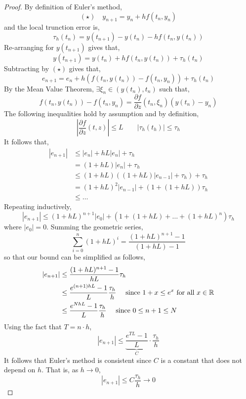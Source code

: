 \begin{proof}
	By definition of Euler's method,
	\[(\star) \quad y_{n+1}=y_n+h f\left(t_n, y_n\right)\]
	and the local trunction error is,
	\[\tau_h\left(t_n\right)=y\left(t_{n+1}\right)-y\left(t_n\right)-h f\left(t_n, y\left(t_n\right)\right)\]
	Re-arranging for $y(t_{n+1})$ gives that,
	\[y\left(t_{n+1}\right)=y\left(t_n\right)+h f\left(t_n, y\left(t_n\right)\right)+\tau_h\left(t_n\right)\]
	Subtracting by $(\star)$ gives that,
	\[e_{n+1}=e_n+h\left(f\left(t_n, y\left(t_n\right)\right)-f\left(t_n, y_n\right)\right)+\tau_h\left(t_n\right)\]
	By the Mean Value Theorem, $\exists \xi_n \in (y(t_n), t_n)$ such that,
	\[f\left(t_n, y\left(t_n\right)\right)-f\left(t_n, y_n\right) = \frac{\partial f}{\partial z}\left(t_n, \xi_n\right)\left(y\left(t_n\right)-y_n\right)\]
	The following inequalities hold by assumption and by definition,
	\[\left|\frac{\partial f}{\partial z}(t, z)\right| \leq L \quad \quad \left|\tau_h\left(t_h\right)\right| \leq \tau_h\]
	It follows that,
	\begin{align*}
	\left|e_{n+1}\right| & \leq\left|e_n\right|+h L\left|e_n\right|+\tau_h \\
	&=(1+h L)\left|e_n\right|+\tau_h \\
	& \leq(1+h L)\left((1+h L)\left|e_{n-1}\right|+\tau_h\right)+\tau_h \\
	&=(1+h L)^2\left|e_{n-1}\right|+(1+(1+h L)) \tau_h \\
	& \leq \ldots
	\end{align*}
	Repeating inductively,
	\[\left|e_{n+1}\right| \leq(1+h L)^{n+1}\left|e_0\right|+\left(1+(1+h L)+\ldots+(1+h L)^n\right) \tau_h\]
	where $|e_0| = 0$. Summing the geometric series,
	\[\sum_{i=0}^n(1+h L)^i = \frac{(1+h L)^{n+1}-1}{(1+h L)-1}\]
	so that our bound can be simplified as follows,
	\begin{align*}
	|e_{n+1}|
	&\leq \frac{(1+h L)^{n+1}-1}{h L} \tau_h \\
	&\leq \frac{e^{(n+1) h L}-1}{L} \frac{\tau_h}{h} \quad \text{ since } 1 + x \leq e^x \text{ for all } x \in \mathbb{R} \\
	&\leq \frac{e^{N h L}-1}{L} \frac{\tau_h}{h} \quad \text{ since } 0 \leq n + 1 \leq N
	\end{align*}
	Using the fact that $T = n \cdot h$, 
	\[\left|e_{n+1}\right| \leq \underbrace{\frac{e^{T L}-1}{L}}_{C} \cdot \frac{\tau_h}{h}\]
	It follows that Euler's method is consistent since $C$ is a constant that does not depend on $h$. That is, as $h \rightarrow 0$,
	\[\left|e_{n+1}\right| \leq C \frac{\tau_h}{h} \rightarrow 0\]
\end{proof}

